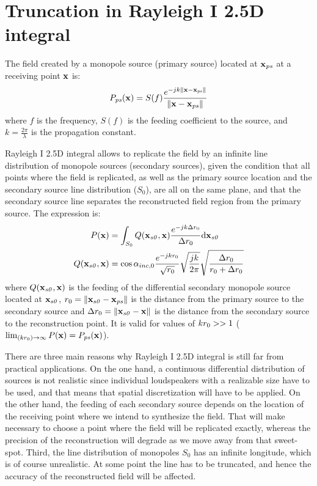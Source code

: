 \chapter{Truncation in Rayleigh I 2.5D integral}

The field created by a monopole source (primary source) located at $\PosTheo[primarySource]$ at a receiving point $\PosTheo$ is:
\begin{equation}
P_{\PosTheoSubInd[primarySource]}(\PosTheo) = S(f)  \frac{e^{-jk\norm{\PosTheo - \PosTheo[primarySource]}}}{\norm{\PosTheo - \PosTheo[primarySource]}}
\end{equation}
where $f$ is the frequency, $S(f)$ is the feeding coefficient to the source, and $k = \frac{2\pi}{\lambda}$ is the propagation constant.

Rayleigh I 2.5D integral allows to replicate the field by an infinite line distribution of monopole sources (secondary sources), given the condition that all points where the field is replicated, as well as the primary source location and the secondary source line distribution ($S_0$), are all on the same plane, and that the secondary source line separates the reconstructed field region from the primary source. The expression is:
\begin{equation}
\begin{aligned}
P(\PosTheo) &= \int_{S_0} Q(\PosTheo[section], \PosTheo) \frac{e^{-jk\distLinePoint}}{\distLinePoint} \mathrm{d}\PosTheo[section]\\
Q(\PosTheo[section], \PosTheo) &= \cos\normPrimaryPropAngleSection \frac{e^{-jk\distLinePrimSource}}{\sqrt{\distLinePrimSource}} \sqrt{\frac{j k}{2\pi}} \sqrt{\frac{\distLinePoint}{\distLinePrimSource + \distLinePoint}}
\end{aligned}
\end{equation}
where $Q(\PosTheo[section], \PosTheo)$ is the feeding of the differential secondary monopole source located at $\PosTheo[section]$, $\distLinePrimSource = \norm{\PosTheo[section] - \PosTheo[primarySource]}$ is the distance from the primary source to the secondary source and $\distLinePoint = \norm{\PosTheo[section] - \PosTheo}$ is the distance from the secondary source to the reconstruction point. It is valid for values of $kr_0 >> 1$ ($\lim_{(k\distLinePrimSource) \to \infty} P(\PosTheo) = P_{\PosTheoSubInd[primarySource]}(\PosTheo)$).

There are three main reasons why Rayleigh I 2.5D integral is still far from practical applications. On the one hand, a continuous differential distribution of sources is not realistic since individual loudspeakers with a realizable size have to be used, and that means that spatial discretization will have to be applied. On the other hand, the feeding of each secondary source depends on the location of the receiving point where we intend to synthesize the field. That will make necessary to choose a point where the field will be replicated exactly, whereas the precision of the reconstruction will degrade as we move away from that sweet-spot. Third, the line distribution of monopoles $S_0$ has an infinite longitude, which is of course unrealistic. At some point the line has to be truncated, and hence the accuracy of the reconstructed field will be affected.

